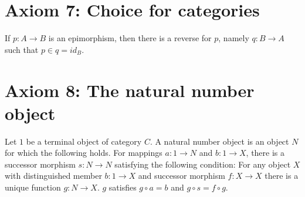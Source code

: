 \documentclass[a4paper, 12pt]{article}
\begin{document}
\section*{Axiom 7: Choice for categories}
If $p: A \longrightarrow B$ is an epimorphism, then there is a reverse for $p$, namely $q: B \longrightarrow A$ such that $p \in q = id_{B}$.

\section*{Axiom 8: The natural number object}
Let $1$ be a terminal object of category $C$. A natural number object is an object $N$ for which the following holds. For mappings $a: 1 \longrightarrow N$ and $b: 1  \longrightarrow X$, there is a successor morphism $s: N \longrightarrow N$ satisfying the following condition: For any object $X$ with distinguished member $b: 1 \longrightarrow X$ and successor morphism $f: X \longrightarrow X$ there is a unique function $g: N \longrightarrow X$. $g$ satisfies $g \circ a = b$ and $g \circ s = f \circ g$. 




                                 
\end{document}
